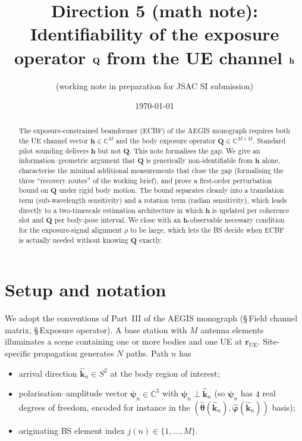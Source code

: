 \documentclass[11pt,a4paper]{article}
\title{Direction 5 (math note): \\
       Identifiability of the exposure operator \texorpdfstring{$\Q$}{Q}
       from the UE channel \texorpdfstring{$\hh$}{h}}
\author{(working note in preparation for JSAC SI submission)}
\date{\today}
\theoremstyle{definition}
\newcommand{\rr}{\mathbf{r}}
\newcommand{\hh}{\mathbf{h}}
\newcommand{\kh}{\hat{\mathbf{k}}}
\newcommand{\Q}{\mathbf{Q}}
\newcommand{\psib}{\boldsymbol{\psi}}
\newcommand{\C}{\mathbb{C}}
\begin{document}
\maketitle

\begin{abstract}
The exposure-constrained beamformer (ECBF) of the AEGIS monograph requires both
the UE channel vector $\hh\in\C^M$ and the body exposure operator $\Q\in\C^{M\times M}$.
Standard pilot sounding delivers $\hh$ but not $\Q$. This note formalises the
gap. We give an information--geometric argument that $\Q$ is generically
non-identifiable from $\hh$ alone, characterise the minimal additional
measurements that close the gap (formalising the three ``recovery routes''
of the working brief), and prove a first-order perturbation bound on $\Q$
under rigid body motion. The bound separates cleanly into a translation
term (sub-wavelength sensitivity) and a rotation term (radian sensitivity),
which leads directly to a two-timescale estimation architecture in which
$\hh$ is updated per coherence slot and $\Q$ per body-pose interval.
We close with an $\hh$-observable necessary condition for the
exposure-signal alignment $\rho$ to be large, which lets the BS decide
when ECBF is actually needed without knowing $\Q$ exactly.
\end{abstract}

\section{Setup and notation}
\label{sec:setup}

We adopt the conventions of Part~III of the AEGIS monograph
(\S\,Field channel matrix, \S\,Exposure operator).
A base station with $M$ antenna elements illuminates a scene containing one
or more bodies and one UE at $\rr_{\mathrm{UE}}$. Site-specific propagation
generates $N$ paths. Path $n$ has

\begin{itemize}[leftmargin=2em,itemsep=2pt]
\item arrival direction $\kh_n \in S^2$ at the body region of interest;
\item polarisation--amplitude vector
      $\psib_n \in \C^3$ with $\psib_n \perp \kh_n$
      (so $\psib_n$ has $4$ real degrees of freedom, encoded for instance
      in the $(\hat{\boldsymbol{\theta}}(\kh_n),\hat{\boldsymbol{\varphi}}(\kh_n))$
      basis);
\item originating BS element index $j(n)\in\{1,\dots,M\}$.
\end{itemize}
\end{document}
